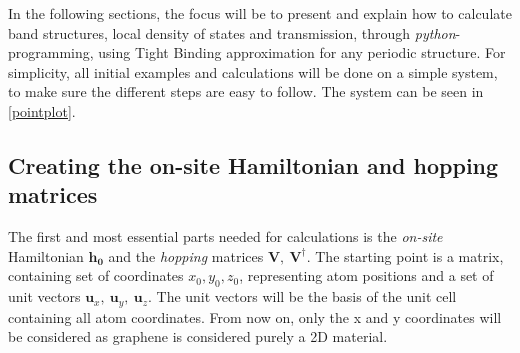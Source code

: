 In the following sections, the focus will be to present and explain how to calculate band structures, local density of states and transmission, through \textit{python}-programming, using Tight Binding approximation for any periodic structure. For simplicity, all initial examples and calculations will be done on a simple system, to make sure the different steps are easy to follow. The system can be seen in \cref{pointplot}.
\subsection{Creating the on-site Hamiltonian and hopping matrices}
The first and most essential parts needed for calculations is the \textit{on-site} Hamiltonian \(\mathbf{h_0}\) and the \textit{hopping} matrices \(\mathbf{V},\ \mathbf{V}^{\dagger}\). The starting point is a matrix, containing set of coordinates \(x_0,y_0,z_0\), representing atom positions  and a set of unit vectors \(\mathbf{u}_x, \ \mathbf{u}_y, \ \mathbf{u}_z\). The unit vectors will be the basis of the unit cell containing all atom coordinates. From now on, only the x and y coordinates will be considered as graphene is considered purely a 2D material.
